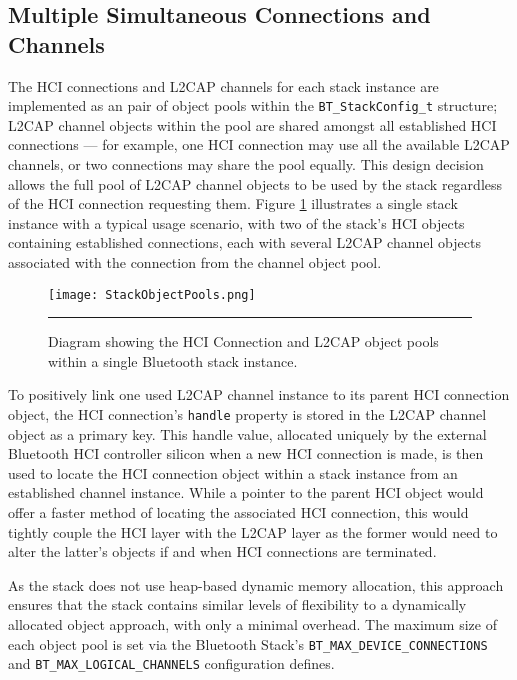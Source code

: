 

\FloatBarrier
\subsection{Multiple Simultaneous Connections and Channels}

The HCI connections and L2CAP channels for each stack instance are implemented as an pair of object pools within the \lstinline{BT_StackConfig_t} structure; L2CAP channel objects within the pool are shared amongst all established HCI connections --- for example, one HCI connection may use all the available L2CAP channels, or two connections may share the pool equally. This design decision allows the full pool of L2CAP channel objects to be used by the stack regardless of the HCI connection requesting them. Figure \ref{fig:stackobjectpools} illustrates a single stack instance with a typical usage scenario, with two of the stack's HCI objects containing established connections, each with several L2CAP channel objects associated with the connection from the channel object pool.

\begin{figure}[tbph]
	\vspace{1em}
	\centering
		\texttt{[image: StackObjectPools.png]}
	\rule{35em}{0.5pt}
	\caption[Diagram of the Bluetooth stack instance object pools]{Diagram showing the HCI Connection and L2CAP object pools within a single Bluetooth stack instance.}
	\label{fig:stackobjectpools}
\end{figure}

To positively link one used L2CAP channel instance to its parent HCI connection object, the HCI connection's \lstinline{handle} property is stored in the L2CAP channel object as a primary key. This handle value, allocated uniquely by the external Bluetooth HCI controller silicon when a new HCI connection is made, is then used to locate the HCI connection object within a stack instance from an established channel instance. While a pointer to the parent HCI object would offer a faster method of locating the associated HCI connection, this would tightly couple the HCI layer with the L2CAP layer as the former would need to alter the latter's objects if and when HCI connections are terminated.

As the stack does not use heap-based dynamic memory allocation, this approach ensures that the stack contains similar levels of flexibility to a dynamically allocated object approach, with only a minimal overhead. The maximum size of each object pool is set via the Bluetooth Stack's \lstinline{BT_MAX_DEVICE_CONNECTIONS} and \lstinline{BT_MAX_LOGICAL_CHANNELS} configuration defines.


